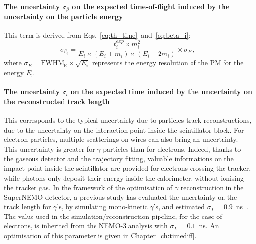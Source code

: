 \paragraph{The uncertainty $\sigma_{\beta}$ on the expected time-of-flight induced by the uncertainty on the particle energy}
This term is derived from Eqs.~\eqref{eq:th_time}~and~\eqref{eq:beta_i}:
\begin{equation}
  \sigma_{\beta_{i}} = \frac{t^{exp}_{i}\times m_{i}^{2}}{E_{i}\times (E_{i}+m_{i})\times (E_{i}+2m_{i})}\times \sigma_{E}\,,
  \label{eq:sigma_L}
\end{equation}
where $\sigma_{E}= \text{FWHM}_{\text{E}} \times \sqrt{E_{i}}$ represents the energy resolution of the PM for the energy $E_{i}$.

\paragraph{The uncertainty $\sigma_{l}$ on the expected time induced by the uncertainty on the reconstructed track length}
This corresponds to the typical uncertainty due to particles track reconstructions, due to the uncertainty on the interaction point inside the scintillator block.
For electron particles, multiple scatterings on wires can also bring an uncertainty.
This uncertainty is greater for $\gamma$ particles than for electrons.
Indeed, thanks to the gaseous detector and the trajectory fitting, valuable informations on the impact point inside the scintillator are provided for electrons crossing the tracker, while photons only deposit their energy inside the calorimeter, without ionising the tracker gas.
In the framework of the optimisation of $\gamma$ reconstruction in the SuperNEMO detector, a previous study has evaluated the uncertainty on the track length for $\gamma$'s, by simulating mono-kinetic $\gamma$'s, and estimated $\sigma_{L}=0.9$~ns~\cite{CalvezThesis}.
The value used in the simulation/reconstruction pipeline, for the case of electrons, is inherited from the NEMO-$3$ analysis with $\sigma_{L}=0.1$~ns.
An optimisation of this parameter is given in Chapter~\ref{ch:timediff}.

\paragraph{}

